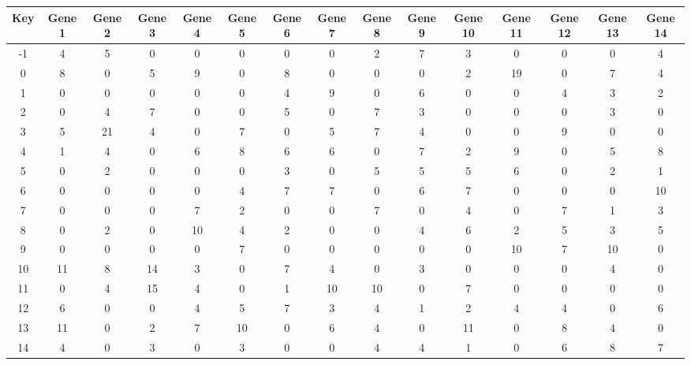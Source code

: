 \begin{tabular}{|c|c|c|c|c|c|c|c|c|c|c|c|c|c|c|}
\hline
Key & Gene 1 & Gene 2 & Gene 3 & Gene 4 & Gene 5 & Gene 6 & Gene 7 & Gene 8 & Gene 9 & Gene 10 & Gene 11 & Gene 12 & Gene 13 & Gene 14 \\
\hline
-1 & 4 & 5 & 0 & 0 & 0 & 0 & 0 & 2 & 7 & 3 & 0 & 0 & 0 & 4 \\
0 & 8 & 0 & 5 & 9 & 0 & 8 & 0 & 0 & 0 & 2 & 19 & 0 & 7 & 4 \\
1 & 0 & 0 & 0 & 0 & 0 & 4 & 9 & 0 & 6 & 0 & 0 & 4 & 3 & 2 \\
2 & 0 & 4 & 7 & 0 & 0 & 5 & 0 & 7 & 3 & 0 & 0 & 0 & 3 & 0 \\
3 & 5 & 21 & 4 & 0 & 7 & 0 & 5 & 7 & 4 & 0 & 0 & 9 & 0 & 0 \\
4 & 1 & 4 & 0 & 6 & 8 & 6 & 6 & 0 & 7 & 2 & 9 & 0 & 5 & 8 \\
5 & 0 & 2 & 0 & 0 & 0 & 3 & 0 & 5 & 5 & 5 & 6 & 0 & 2 & 1 \\
6 & 0 & 0 & 0 & 0 & 4 & 7 & 7 & 0 & 6 & 7 & 0 & 0 & 0 & 10 \\
7 & 0 & 0 & 0 & 7 & 2 & 0 & 0 & 7 & 0 & 4 & 0 & 7 & 1 & 3 \\
8 & 0 & 2 & 0 & 10 & 4 & 2 & 0 & 0 & 4 & 6 & 2 & 5 & 3 & 5 \\
9 & 0 & 0 & 0 & 0 & 7 & 0 & 0 & 0 & 0 & 0 & 10 & 7 & 10 & 0 \\
10 & 11 & 8 & 14 & 3 & 0 & 7 & 4 & 0 & 3 & 0 & 0 & 0 & 4 & 0 \\
11 & 0 & 4 & 15 & 4 & 0 & 1 & 10 & 10 & 0 & 7 & 0 & 0 & 0 & 0 \\
12 & 6 & 0 & 0 & 4 & 5 & 7 & 3 & 4 & 1 & 2 & 4 & 4 & 0 & 6 \\
13 & 11 & 0 & 2 & 7 & 10 & 0 & 6 & 4 & 0 & 11 & 0 & 8 & 4 & 0 \\
14 & 4 & 0 & 3 & 0 & 3 & 0 & 0 & 4 & 4 & 1 & 0 & 6 & 8 & 7 \\
\hline
\end{tabular}